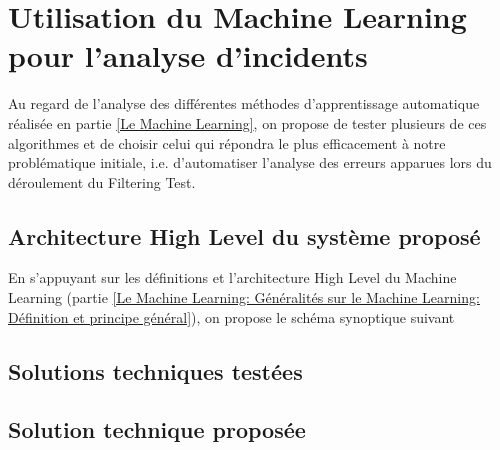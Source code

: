 \chapter{Utilisation du Machine Learning pour l'analyse d'incidents}
\label{Utilisation du Machine Learning pour l'analyse d'incidents}
\thispagestyle{fancy}

Au regard de l'analyse des différentes méthodes d'apprentissage automatique réalisée en partie \ref{Le Machine Learning}, on propose de tester plusieurs de ces algorithmes et de choisir celui qui répondra le plus efficacement à notre problématique initiale, i.e. d'automatiser l'analyse des erreurs apparues lors du déroulement du Filtering Test.

\section{Architecture High Level du système proposé}
\label{Utilisation du Machine Learning pour l'analyse d'incidents: Achitecture High Level du système proposé}
En s'appuyant sur les définitions et l'architecture High Level du Machine Learning (partie \ref{Le Machine Learning: Généralités sur le Machine Learning: Définition et principe général}), on propose le schéma synoptique suivant
\section{Solutions techniques testées}
\label{Utilisation du Machine Learning pour l'analyse d'incidents: Solutions techniques testées}

\section{Solution technique proposée}
\label{Utilisation du Machine Learning pour l'analyse d'incidents: Solution technique proposée}

